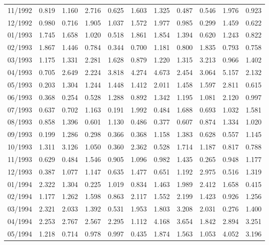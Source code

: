 \begin{tabular}{lrrrrrrrrrr}
11/1992 &  0.819 &  1.160 &  2.716 &  0.625 &  1.603 &  1.325 &  0.487 &  0.546 &  1.976 &  0.923 \\
12/1992 &  0.980 &  0.716 &  1.905 &  1.037 &  1.572 &  1.977 &  0.985 &  0.299 &  1.459 &  0.622 \\
01/1993 &  1.745 &  1.658 &  1.020 &  0.518 &  1.861 &  1.854 &  1.394 &  0.620 &  1.243 &  0.822 \\
02/1993 &  1.867 &  1.446 &  0.784 &  0.344 &  0.700 &  1.181 &  0.800 &  1.835 &  0.793 &  0.758 \\
03/1993 &  1.175 &  1.331 &  2.281 &  1.628 &  0.879 &  1.220 &  1.315 &  3.213 &  0.966 &  1.402 \\
04/1993 &  0.705 &  2.649 &  2.224 &  3.818 &  4.274 &  4.673 &  2.454 &  3.064 &  5.157 &  2.132 \\
05/1993 &  0.203 &  1.304 &  1.244 &  1.448 &  1.412 &  2.011 &  1.458 &  1.597 &  2.811 &  0.615 \\
06/1993 &  0.368 &  0.254 &  0.528 &  1.288 &  0.892 &  1.342 &  1.195 &  1.081 &  2.120 &  0.997 \\
07/1993 &  0.637 &  0.702 &  1.163 &  0.191 &  1.992 &  0.484 &  1.688 &  0.693 &  1.032 &  1.581 \\
08/1993 &  0.858 &  1.396 &  0.601 &  1.130 &  0.486 &  0.377 &  0.607 &  0.874 &  1.334 &  1.020 \\
09/1993 &  0.199 &  1.286 &  0.298 &  0.366 &  0.368 &  1.158 &  1.383 &  0.628 &  0.557 &  1.145 \\
10/1993 &  1.311 &  3.126 &  1.050 &  0.360 &  2.362 &  0.528 &  1.714 &  1.187 &  0.817 &  0.788 \\
11/1993 &  0.629 &  0.484 &  1.546 &  0.905 &  1.096 &  0.982 &  1.435 &  0.265 &  0.948 &  1.177 \\
12/1993 &  0.387 &  1.077 &  1.147 &  0.635 &  1.477 &  0.651 &  1.192 &  2.975 &  0.516 &  1.319 \\
01/1994 &  2.322 &  1.304 &  0.225 &  1.019 &  0.834 &  1.463 &  1.989 &  2.412 &  1.658 &  0.415 \\
02/1994 &  1.177 &  1.262 &  1.598 &  0.863 &  2.117 &  1.552 &  2.199 &  1.423 &  0.926 &  1.256 \\
03/1994 &  2.321 &  2.033 &  1.392 &  0.531 &  1.953 &  1.803 &  3.208 &  2.031 &  0.276 &  1.400 \\
04/1994 &  2.253 &  2.767 &  2.567 &  2.295 &  1.112 &  4.168 &  3.654 &  1.842 &  2.894 &  3.251 \\
05/1994 &  1.218 &  0.714 &  0.978 &  0.997 &  0.435 &  1.874 &  1.563 &  1.053 &  4.052 &  3.196 \\

\end{tabular}
